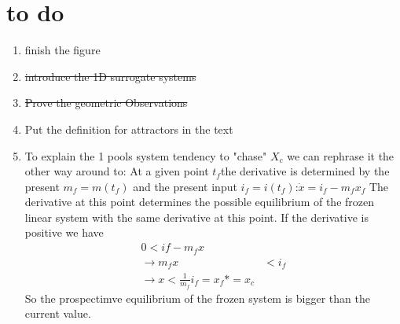 \documentclass[journal abbreviation, manuscript]{copernicus}
\theoremstyle{definition}
\begin{document}
\section{to do}
\begin{enumerate}
\item
  finish the figure
\item
  \sout{introduce the 1D surrogate systems}
\item
  \sout{Prove the geometric Observations} 
\item
  Put the definition for attractors in the text
\item 
To explain the 1 pools system tendency to "chase" $X_c$ we can rephrase it the other way around to:
At a given point $t_f$the derivative is determined by the present $m_f=m(t_f)$ 
and the present input $i_f=i(t_f)$:$\dot{x} = i_f-m_f x_f$ 
The derivative at this point determines the possible equilibrium of the frozen linear system with the same derivative at this point.
If the derivative is positive we have 
\begin{align*}
0 < if - m_f x \\
\rightarrow 
m_f x & < i_f \\
\rightarrow 
x < \frac{1}{m_f} i_f=x_f* = x_c
\end{align*}
So the prospectimve equilibrium of the frozen system is bigger than the current value.
\end{enumerate}
\end{document}
